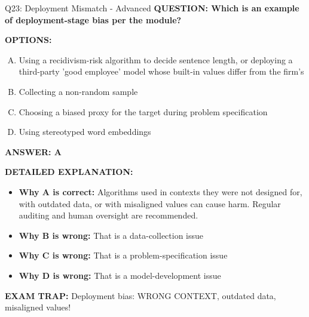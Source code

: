 \documentclass[8pt]{beamer}
\begin{document}
\begin{frame}[shrink=6]{Q23: Deployment Mismatch - Advanced}
\fontsize{6.5}{7.5}\selectfont
\textbf{QUESTION: Which is an example of deployment-stage bias per the module?}

\vspace{0.1cm}
\textbf{OPTIONS:}
\begin{enumerate}[A.]
\item Using a recidivism-risk algorithm to decide sentence length, or deploying a third-party 'good employee' model whose built-in values differ from the firm's
\item Collecting a non-random sample
\item Choosing a biased proxy for the target during problem specification
\item Using stereotyped word embeddings
\end{enumerate}

\vspace{0.1cm}
\textcolor{myblue}{\textbf{ANSWER: A}}

\vspace{0.1cm}
\textbf{DETAILED EXPLANATION:}
\begin{itemize}
\item \textbf{Why A is correct:} Algorithms used in contexts they were not designed for, with outdated data, or with misaligned values can cause harm. Regular auditing and human oversight are recommended.
\item \textbf{Why B is wrong:} That is a data-collection issue
\item \textbf{Why C is wrong:} That is a problem-specification issue
\item \textbf{Why D is wrong:} That is a model-development issue
\end{itemize}

\textcolor{myred}{\textbf{EXAM TRAP:}} Deployment bias: WRONG CONTEXT, outdated data, misaligned values!
\end{frame}

\end{document}
